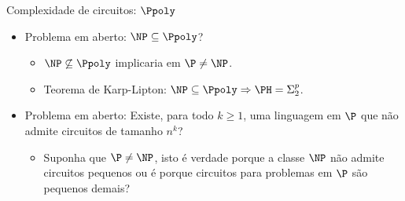 \documentclass[landscape, 9pt]{beamer}
\begin{document}
\begin{frame} {Complexidade de circuitos: $\Ppoly$}

\begin{itemize}

	\item Problema em aberto: $\NP \subseteq \Ppoly$?
	
	\begin{itemize}
	
		\item $\NP \not\subseteq \Ppoly$ implicaria em $\P \neq \NP$.
		
		\item Teorema de Karp-Lipton: $\NP \subseteq \Ppoly \Rightarrow \PH = \Sigma_{2}^{p}$.
	
	\end{itemize}
	
	\item Problema em aberto: Existe, para todo $k \geq 1$, uma linguagem em $\P$ que não admite circuitos de tamanho $n^{k}$?
	
	\begin{itemize}
	
		\item Suponha que $\P \neq \NP$, isto é verdade porque a classe $\NP$ não admite circuitos pequenos ou é porque circuitos para problemas em $\P$ são pequenos demais?
	
	\end{itemize}

\end{itemize}

\end{frame}

\end{document}
